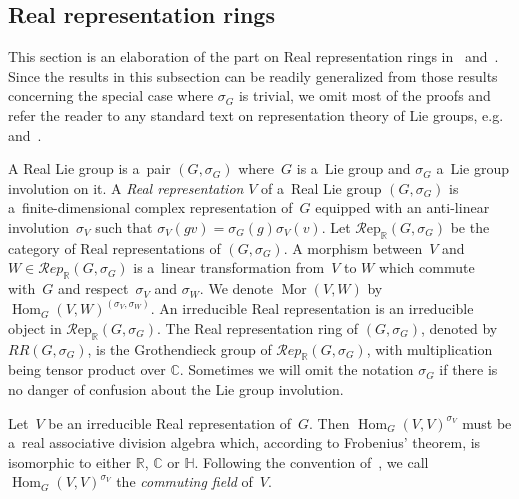 \documentclass[11pt]{article}
\numberwithin{equation}{section}
\DeclareMathOperator{\Mor}{Mor}
\DeclareMathOperator{\Hom}{Hom}
\begin{document}
\subsection{Real representation rings}
This section is an elaboration of the part on Real representation rings in~\cite{AS} and~\cite{Se}.
Since the results in this subsection can be readily generalized from those results concerning the special case
where $\sigma_G$ is trivial, we omit most of the proofs and refer the reader to any standard text on representation theory of
Lie groups, e.g.~\cite{B}
and~\cite{BtD}.
\begin{Definition}
A Real Lie group is a~pair $(G,\sigma_G)$ where~$G$ is a~Lie group and $\sigma_G$ a~Lie group involution on it.
A \emph{Real representation}
$V$ of a~Real Lie group $(G,\sigma_G)$ is a~f\/inite-dimensional complex representation of~$G$ equipped with an anti-linear involution~$\sigma_V$ such
that $\sigma_V(gv)=\sigma_G(g)\sigma_V(v)$.
Let $\mathcal{R}\text{ep}_\mathbb{R}(G,
\sigma_G)$ be the category of Real representations of $(G, \sigma_G)$.
A morphism between~$V$ and $W\in \mathcal{R}
ep_\mathbb{R}(G,
\sigma_G)$ is a~linear transformation from~$V$ to $W$ which commute with~$G$ and respect~$\sigma_V$ and $\sigma_W$.
We denote $\Mor
(V, W)$ by $\Hom_G(V, W)^{(\sigma_V, \sigma_W)}$.
An irreducible Real representation is an irreducible object in $\mathcal{R}\text{ep}_\mathbb{R}(G,
\sigma_G)$.
The Real representation ring of $(G, \sigma_G)$, denoted by $RR(G, \sigma_G)$, is the Grothendieck group of $\mathcal{R}
ep_\mathbb{R}(G,
\sigma_G)$, with multiplication being tensor product over $\mathbb{C}$.
Sometimes we will omit the notation $\sigma_G$ if there is no danger of confusion about the Lie group involution.
\end{Definition}
\begin{Remark}
Let~$V$ be an irreducible Real representation of~$G$.
Then $\Hom_G(V, V)^{\sigma_V}$ must be a~real associative division algebra which, according to Frobenius' theorem, is isomorphic to either
$\mathbb{R}$, $\mathbb{C}$ or $\mathbb{H}$.
Following the convention of~\cite{AS}, we call $\Hom_G(V, V)^{\sigma_V}$ the \emph{commuting field} of~$V$.
\end{Remark}
\end{document}
